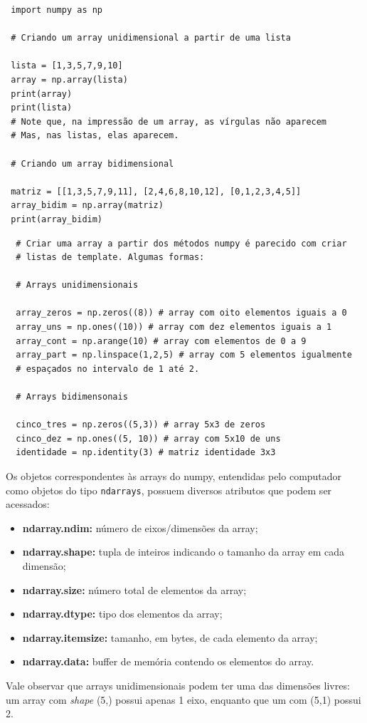 \documentclass[../numerical_methods.tex]{subfiles}
\begin{document}
\begin{listing}
	\caption{Criando arrays a partir de listas.}
	\begin{verbatim}
 import numpy as np 

 # Criando um array unidimensional a partir de uma lista 

 lista = [1,3,5,7,9,10]
 array = np.array(lista)
 print(array)
 print(lista)
 # Note que, na impressão de um array, as vírgulas não aparecem 
 # Mas, nas listas, elas aparecem.
 
 # Criando um array bidimensional

 matriz = [[1,3,5,7,9,11], [2,4,6,8,10,12], [0,1,2,3,4,5]] 
 array_bidim = np.array(matriz)
 print(array_bidim)

 \end{verbatim}

	\caption{Criando arrays pelo numpy.}
	\begin{verbatim}
  # Criar uma array a partir dos métodos numpy é parecido com criar 
  # listas de template. Algumas formas: 

  # Arrays unidimensionais 

  array_zeros = np.zeros((8)) # array com oito elementos iguais a 0
  array_uns = np.ones((10)) # array com dez elementos iguais a 1 
  array_cont = np.arange(10) # array com elementos de 0 a 9
  array_part = np.linspace(1,2,5) # array com 5 elementos igualmente 
  # espaçados no intervalo de 1 até 2.

  # Arrays bidimensonais 

  cinco_tres = np.zeros((5,3)) # array 5x3 de zeros
  cinco_dez = np.ones((5, 10)) # array com 5x10 de uns
  identidade = np.identity(3) # matriz identidade 3x3
 \end{verbatim}
\end{listing}

Os objetos correspondentes às arrays do numpy, entendidas pelo computador como objetos do tipo \texttt{ndarrays}, possuem diversos atributos que podem ser acessados:
\begin{itemize}
	\item \textbf{ndarray.ndim:} número de eixos/dimensões da array;
	\item \textbf{ndarray.shape:} tupla de inteiros indicando o tamanho da array em cada dimensão;
	\item \textbf{ndarray.size:} número total de elementos da array;
	\item \textbf{ndarray.dtype:} tipo dos elementos da array;
	\item \textbf{ndarray.itemsize:} tamanho, em bytes, de cada elemento da array;
	\item \textbf{ndarray.data:} buffer de memória contendo os elementos do array.
\end{itemize}
Vale observar que arrays unidimensionais podem ter uma das dimensões livres: um array com \textit{shape} (5,) possui apenas 1 eixo, enquanto que um com (5,1) possui 2.
\end{document}
